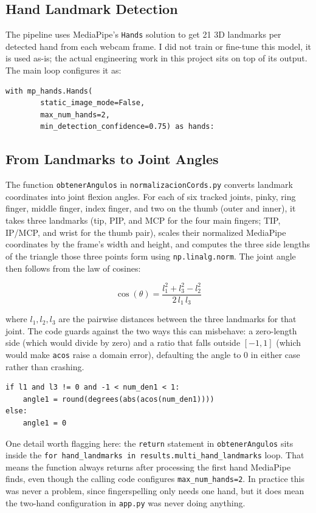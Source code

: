\documentclass[11pt]{article}
\begin{document}
\subsection{Hand Landmark Detection}

The pipeline uses MediaPipe's \texttt{Hands} solution to get 21 3D landmarks per detected hand from each webcam frame. I did not train or fine-tune this model, it is used as-is; the actual engineering work in this project sits on top of its output. The main loop configures it as:

\begin{lstlisting}
with mp_hands.Hands(
        static_image_mode=False,
        max_num_hands=2,
        min_detection_confidence=0.75) as hands:
\end{lstlisting}

\subsection{From Landmarks to Joint Angles}

The function \texttt{obtenerAngulos} in \texttt{normalizacionCords.py} converts landmark coordinates into joint flexion angles. For each of six tracked joints, pinky, ring finger, middle finger, index finger, and two on the thumb (outer and inner), it takes three landmarks (tip, PIP, and MCP for the four main fingers; TIP, IP/MCP, and wrist for the thumb pair), scales their normalized MediaPipe coordinates by the frame's width and height, and computes the three side lengths of the triangle those three points form using \texttt{np.linalg.norm}. The joint angle then follows from the law of cosines:

\[
\cos(\theta) = \frac{l_1^2 + l_3^2 - l_2^2}{2 \, l_1 \, l_3}
\]

where $l_1, l_2, l_3$ are the pairwise distances between the three landmarks for that joint. The code guards against the two ways this can misbehave: a zero-length side (which would divide by zero) and a ratio that falls outside $[-1, 1]$ (which would make \texttt{acos} raise a domain error), defaulting the angle to $0$ in either case rather than crashing.

\begin{lstlisting}
if l1 and l3 != 0 and -1 < num_den1 < 1:
    angle1 = round(degrees(abs(acos(num_den1))))
else:
    angle1 = 0
\end{lstlisting}

One detail worth flagging here: the \texttt{return} statement in \texttt{obtenerAngulos} sits inside the \texttt{for hand\_landmarks in results.multi\_hand\_landmarks} loop. That means the function always returns after processing the first hand MediaPipe finds, even though the calling code configures \texttt{max\_num\_hands=2}. In practice this was never a problem, since fingerspelling only needs one hand, but it does mean the two-hand configuration in \texttt{app.py} was never doing anything.
\end{document}
